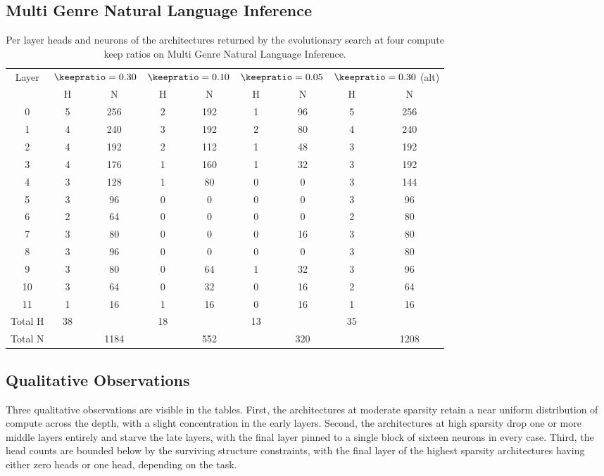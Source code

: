 \subsection{Multi Genre Natural Language Inference}

\begin{table}[h]
\centering
\caption{Per layer heads and neurons of the architectures returned by the evolutionary search at four compute keep ratios on Multi Genre Natural Language Inference.}
\begin{tabular}{ccccccccc}
\toprule
Layer & \multicolumn{2}{c}{$\keepratio = 0.30$} & \multicolumn{2}{c}{$\keepratio = 0.10$} & \multicolumn{2}{c}{$\keepratio = 0.05$} & \multicolumn{2}{c}{$\keepratio = 0.30$ (alt)} \\
& H & N & H & N & H & N & H & N \\
\midrule
0  & 5 & 256 & 2 & 192 & 1 & 96  & 5 & 256 \\
1  & 4 & 240 & 3 & 192 & 2 & 80  & 4 & 240 \\
2  & 4 & 192 & 2 & 112 & 1 & 48  & 3 & 192 \\
3  & 4 & 176 & 1 & 160 & 1 & 32  & 3 & 192 \\
4  & 3 & 128 & 1 & 80  & 0 & 0   & 3 & 144 \\
5  & 3 & 96  & 0 & 0   & 0 & 0   & 3 & 96  \\
6  & 2 & 64  & 0 & 0   & 0 & 0   & 2 & 80  \\
7  & 3 & 80  & 0 & 0   & 0 & 16  & 3 & 80  \\
8  & 3 & 96  & 0 & 0   & 0 & 0   & 3 & 80  \\
9  & 3 & 80  & 0 & 64  & 1 & 32  & 3 & 96  \\
10 & 3 & 64  & 0 & 32  & 0 & 16  & 2 & 64  \\
11 & 1 & 16  & 1 & 16  & 0 & 16  & 1 & 16  \\
\midrule
Total H & 38 & & 18 & & 13 & & 35 \\
Total N & & 1184 & & 552 & & 320 & & 1208 \\
\bottomrule
\end{tabular}
\end{table}

\subsection{Qualitative Observations}

Three qualitative observations are visible in the tables. First, the architectures at moderate sparsity retain a near uniform distribution of compute across the depth, with a slight concentration in the early layers. Second, the architectures at high sparsity drop one or more middle layers entirely and starve the late layers, with the final layer pinned to a single block of sixteen neurons in every case. Third, the head counts are bounded below by the surviving structure constraints, with the final layer of the highest sparsity architectures having either zero heads or one head, depending on the task.
